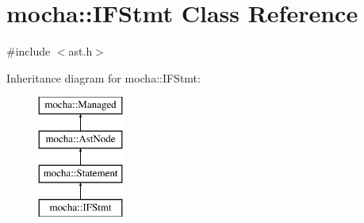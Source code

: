 \hypertarget{classmocha_1_1_i_f_stmt}{
\section{mocha::IFStmt Class Reference}
\label{classmocha_1_1_i_f_stmt}
}


{\ttfamily \#include $<$ast.h$>$}

Inheritance diagram for mocha::IFStmt:\begin{figure}[H]
\begin{center}
\leavevmode
\includegraphics[height=4.000000cm]{classmocha_1_1_i_f_stmt}
\end{center}
\end{figure}
